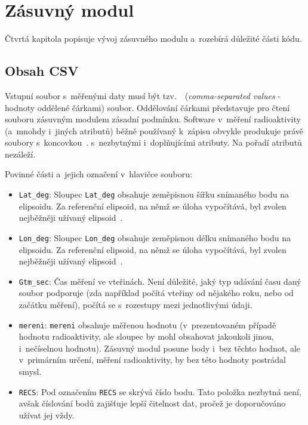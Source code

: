 \chapter{Zásuvný modul}
\label{4-plugin}

Čtvrtá kapitola popisuje vývoj zásuvného modulu a~rozebírá důležité části kódu. 

\section{Obsah CSV}
\label{obsah}

Vstupní soubor s~měřenými daty musí být tzv.~~(\textit{comma-separated values} - hodnoty oddělené
čárkami) soubor. Oddělování čárkami představuje pro čtení souboru zásuvným modulem zásadní podmínku.
Software v~měření radioaktivity (a~mnohdy i~jiných atributů) běžně používaný k~zápisu obvykle
produkuje právě soubory s~koncovkou~. s~nezbytnými i~doplňujícími atributy. Na pořadí
atributů nezáleží. 

Povinné části a~jejich označení v~hlavičce souboru: 
\begin{itemize}
	
	\item {\tt Lat\_deg}: Sloupec {\tt Lat\_deg} obsahuje zeměpisnou šířku snímaného bodu na elipsoidu.
	Za referenční elipsoid, na němž se úloha vypočítává, byl zvolen nejběžněji užívaný
	elipsoid~. 
	
	\item {\tt Lon\_deg}: Sloupec {\tt Lon\_deg} obsahuje zeměpisnou délku snímaného bodu na elipsoidu.
	Za referenční elipsoid, na němž se úloha vypočítává, byl zvolen nejběžněji užívaný
	elipsoid~. 
	
	\item {\tt Gtm\_sec}: Čas měření ve vteřinách. Není důležité, jaký typ udávání času daný soubor
	podporuje (zda například počítá vteřiny od nějakého roku, nebo od začátku měření), počítá
	se s~rozestupy mezi jednotlivými údaji. 
	
	\item {\tt mereni}: {\tt mereni} obsahuje měřenou hodnotu (v~prezentovaném případě hodnotu
	radioaktivity, ale sloupec by mohl obsahovat jakoukoli jinou, i~nečíselnou hodnotu). Zásuvný modul
	posune body i~bez těchto hodnot, ale v~primárním určení, měření
	radioaktivity, by bez této hodnoty postrádal smysl.
	
	\item {\tt RECS}: Pod označením {\tt RECS} se skrývá číslo bodu. Tato položka nezbytná není, avšak
	číslování bodů zajišťuje lepší čitelnost dat, pročež je doporučováno užívat jej vždy. 

\end{itemize}


